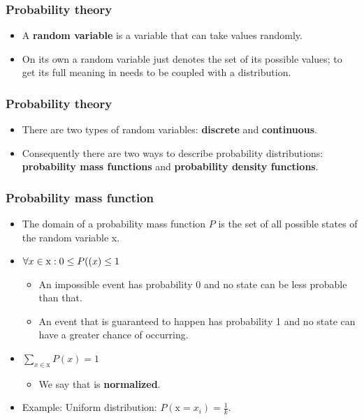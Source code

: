 \documentclass[notes]{beamer}          %
\newif\iffull
\begin{document}
\begin{frame}
\frametitle{Probability theory}
    \begin{itemize}
        \item A {\bf random variable} is a variable that can take values randomly.
        \iffull
        \item We will denote random variables with plain (ordinary text) typeface and their values with standard math typeface\\
        for example, if the random variable is denoted as x its values can be $x_1$ and $x_2$.
        \item A vector-valued random variable is denoted with bold typeface, e.g. {\bf x}.
        \fi
        \item On its own a random variable just denotes the set of its possible values; to get its full meaning in needs to be coupled with a distribution.
    \end{itemize}
\end{frame}


\begin{frame}
\frametitle{Probability theory}
    \begin{itemize}
        \item There are two types of random variables: {\bf discrete} and {\bf continuous}.
        \item Consequently there are two ways to describe probability distributions: {\bf probability mass functions} and {\bf probability density functions}.
    \end{itemize}
\end{frame}


\begin{frame}
\frametitle{Probability mass function}
\begin{itemize}
    \item The domain of a probability mass function $P$ is the set of all possible states of the random variable x.
    \item $\forall x \in \text{x}: 0 \leq P(\text(x) \leq 1$
        \begin{itemize}
            \item An impossible event has probability 0 and no state can be less probable than that.
            \item An event that is guaranteed to happen has probability 1 and no state can have a greater chance of occurring.
        \end{itemize}
    \item $\sum_{x \in \text{x}} P(x) = 1$
        \begin{itemize}
            \item We say that  is {\bf normalized}.
        \end{itemize}
    \item Example: Uniform distribution: $P(\text{x} = x_i) = \frac{1}{k}$.
\end{itemize}
\end{frame}
\end{document}
